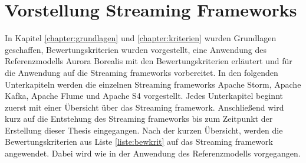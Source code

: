 \chapter{Vorstellung Streaming Frameworks}
\label{chapter:vorstellung}

In Kapitel \ref{chapter:grundlagen} und \ref{chapter:kriterien} wurden Grundlagen geschaffen, Bewertungskriterien wurden vorgestellt, eine Anwendung des Referenzmodells Aurora Borealis mit den Bewertungskriterien erläutert und für die Anwendung auf die Streaming frameworks vorbereitet. In den folgenden Unterkapiteln werden die einzelnen Streaming frameworks Apache Storm, Apache Kafka, Apache Flume und Apache S4 vorgestellt. Jedes Unterkapitel beginnt zuerst mit einer Übersicht über das Streaming framework. Anschließend wird kurz auf die Entstehung des Streaming frameworks bis zum Zeitpunkt der Erstellung dieser Thesis eingegangen. Nach der kurzen Übersicht, werden die Bewertungskriterien aus Liste \ref{liste:bewkrit} auf das Streaming framework angewendet. Dabei wird wie in der Anwendung des Referenzmodells vorgegangen. 









